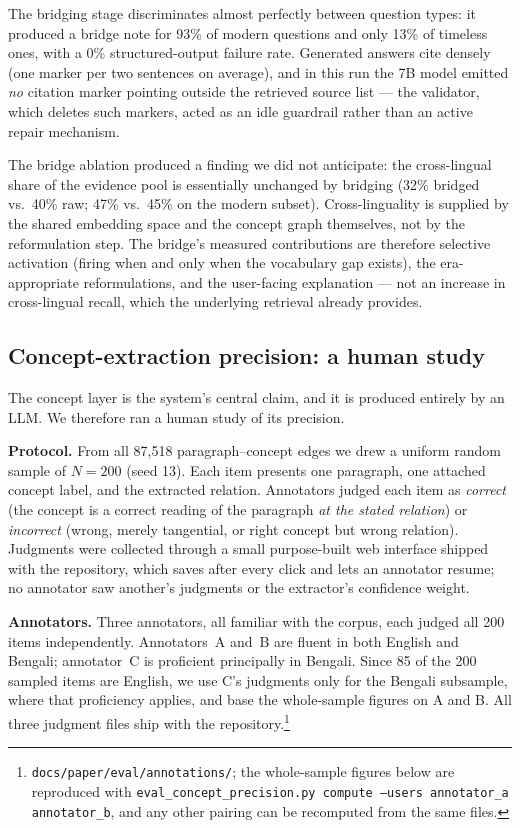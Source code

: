 \documentclass[11pt,a4paper]{article}
\begin{document}
The bridging stage discriminates almost perfectly between question types:
it produced a bridge note for 93\% of modern questions and only 13\% of
timeless ones, with a 0\% structured-output failure rate. Generated
answers cite densely (one marker per two sentences on average), and in
this run the 7B model emitted \emph{no} citation marker pointing outside
the retrieved source list --- the validator, which deletes such markers,
acted as an idle guardrail rather than an active repair mechanism.

The bridge ablation produced a finding we did not anticipate: the
cross-lingual share of the evidence pool is essentially unchanged by
bridging (32\% bridged vs.\ 40\% raw; 47\% vs.\ 45\% on the modern
subset). Cross-linguality is supplied by the shared embedding space and
the concept graph themselves, not by the reformulation step. The bridge's
measured contributions are therefore selective activation (firing when
and only when the vocabulary gap exists), the era-appropriate
reformulations, and the user-facing explanation --- not an increase in
cross-lingual recall, which the underlying retrieval already provides.

\subsection{Concept-extraction precision: a human study}
\label{sec:eval-precision}

The concept layer is the system's central claim, and it is produced
entirely by an LLM. We therefore ran a human study of its precision.

\textbf{Protocol.} From all 87{,}518 paragraph--concept edges we drew a
uniform random sample of $N=200$ (seed 13). Each item presents one
paragraph, one attached concept label, and the extracted relation.
Annotators judged each item as \emph{correct} (the concept is a correct
reading of the paragraph \emph{at the stated relation}) or
\emph{incorrect} (wrong, merely tangential, or right concept but wrong
relation). Judgments were collected through a small purpose-built web
interface shipped with the repository, which saves after every click and
lets an annotator resume; no annotator saw another's judgments or the
extractor's confidence weight.

\textbf{Annotators.} Three annotators, all familiar with the corpus, each
judged all 200 items independently. Annotators~A and~B are fluent in
both English and Bengali; annotator~C is proficient principally in
Bengali. Since 85 of the 200 sampled items are English, we use C's
judgments only for the Bengali subsample, where that proficiency applies,
and base the whole-sample figures on A and B. All three judgment files
ship with the repository.\footnote{\texttt{docs/paper/eval/annotations/};
the whole-sample figures below are reproduced with
\texttt{eval\_concept\_precision.py compute --users annotator\_a annotator\_b}, and any
other pairing can be recomputed from the same files.}
\end{document}

